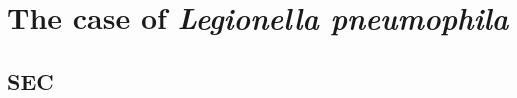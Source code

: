 
\chapter{The case of \textit{Legionella pneumophila}} %

\label{ch:01-03} %


\section{SEC}

\blindtext